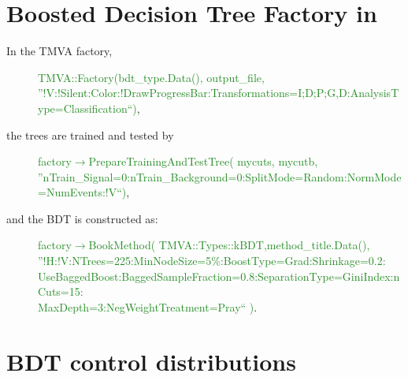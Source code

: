 \section*{Boosted Decision Tree Factory in \TTSR}
In the TMVA factory, 
\begin{description}
	\item[]\textcolor{ForestGreen}{
		TMVA::Factory(bdt\_type.Data(), output\_file, \\
		''!V:!Silent:Color:!DrawProgressBar:Transformations=I;D;P;G,D:AnalysisType=Classification``)},
\end{description}
the trees are trained and tested by 
\begin{description}
	\item[] \textcolor{ForestGreen}{factory$\rightarrow$PrepareTrainingAndTestTree( mycuts, mycutb,\\ ''nTrain\_Signal=0:nTrain\_Background=0:SplitMode=Random:NormMode=NumEvents:!V``)},
\end{description}
and the BDT is constructed as:
\begin{description}
	\item[] \textcolor{ForestGreen}{factory$\rightarrow$BookMethod( TMVA::Types::kBDT,method\_title.Data(),\\''!H:!V:NTrees=225:MinNodeSize=5\%:BoostType=Grad:Shrinkage=0.2:\\UseBaggedBoost:BaggedSampleFraction=0.8:SeparationType=GiniIndex:nCuts=15:\\MaxDepth=3:NegWeightTreatment=Pray`` )}.
\end{description}

\section*{BDT control distributions}

